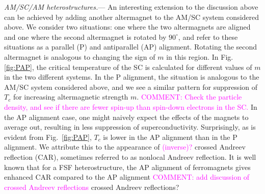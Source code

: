 \documentclass[aps,twocolumn,amsmath,amssymb,preprintnumbers,floatfix,prl,superscriptaddress,longbibliography]{revtex4-2}%
\newcommand{\hans}[1]{\textcolor{Magenta}{{#1}}}
\begin{document}
\textit{AM/SC/AM heterostructures.}---
An interesting extension to the discussion above can be achieved by adding another altermagnet to the AM/SC system considered above. We consider two situations: one where the two altermagnets are aligned and one where the second altermagnet is rotated by $90 ^ \circ$, and refer to these situations as a parallel (P) and antiparallel (AP) alignment.
Rotating the second altermagnet is analogous to changing the sign of $m$ in this region.
In Fig. \ref{fig:PAP}, the critical temperature of the SC is calculated for different values of $m$ in the two different systems.
In the P alignment, the situation is analogous to the AM/SC system considered above, and we see a similar pattern for suppression of $T_c$ for increasing altermagnetic strength $m$. \hans{COMMENT: Check the particle density, and see if there are fewer spin-up than spin-down electrons in the SC.  }
In the AP alignment case, one might naively expect the effects of the magnets to average out, resulting in less suppression of superconductivity. 
Surprisingly, as is evident from Fig.~\ref{fig:PAP}, $T_c$ is lower in the AP alignment than in the P alignment.
We attribute this to the appearance of \hans{(inverse)?} crossed Andreev reflection (CAR), sometimes referred to as nonlocal Andreev reflection.
It is well known that for a FSF heterostructure, the AP alignment of ferromagnets gives enhanced CAR compared to the AP alignment \cite{deutscher_apl_00}
\hans{COMMENT: add discussion of crossed Andreev reflections}
crossed Andreev reflections? 
\end{document}
